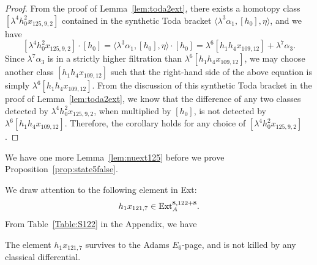 \begin{proof}
    From the proof of Lemma~\ref{lem:toda2ext}, there exists a homotopy class $[\lambda^4 h_0^2x_{125,9,2}]$ contained in the synthetic Toda bracket $ \langle \lambda^3 \alpha_1, [h_0], \eta \rangle$, and we have
    $$[\lambda^4 h_0^2x_{125,9,2}] \cdot [h_0] = \langle \lambda^3 \alpha_1, [h_0], \eta \rangle \cdot [h_0] = \lambda^6 [h_1h_4x_{109,12}] + \lambda^7 \alpha_3.$$
    Since $\lambda^7 \alpha_3$ is in a strictly higher filtration than $\lambda^6 [h_1h_4x_{109,12}]$, we may choose another class $[h_1h_4x_{109,12}]$ such that the right-hand side of the above equation is simply $\lambda^6 [h_1h_4x_{109,12}]$. From the discussion of this synthetic Toda bracket in the proof of Lemma~\ref{lem:toda2ext}, we know that the difference of any two classes detected by $\lambda^4 h_0^2x_{125,9,2}$, when multiplied by $[h_0]$, is not detected by $\lambda^6 [h_1h_4x_{109,12}]$. Therefore, the corollary holds for any choice of $[\lambda^4 h_0^2x_{125,9,2}]$.
\end{proof}
















We have one more Lemma~\ref{lem:nuext125} before we prove Proposition~\ref{prop:state5false}.

We draw attention to the following element in Ext:
$$h_1x_{121,7} \in \mathrm{Ext}_A^{8,122+8}.$$
From Table~\ref{Table:S122} in the Appendix, we have
\begin{axiom} \label{fact:h1x1217}
    The element $h_1x_{121,7}$ survives to the Adams $E_6$-page, and is not killed by any classical differential.
\end{axiom}

